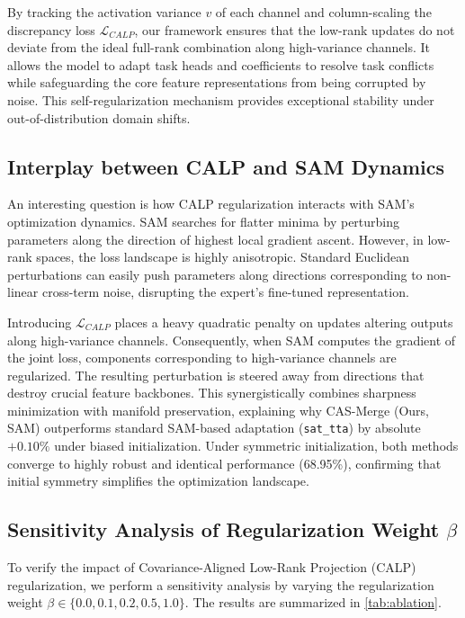 \documentclass{article}
\begin{document}
By tracking the activation variance $v$ of each channel and column-scaling the discrepancy loss $\mathcal{L}_{CALP}$, our framework ensures that the low-rank updates do not deviate from the ideal full-rank combination along high-variance channels. It allows the model to adapt task heads and coefficients to resolve task conflicts while safeguarding the core feature representations from being corrupted by noise. This self-regularization mechanism provides exceptional stability under out-of-distribution domain shifts.

\subsection{Interplay between CALP and SAM Dynamics}
An interesting question is how CALP regularization interacts with SAM's optimization dynamics. SAM searches for flatter minima by perturbing parameters along the direction of highest local gradient ascent. However, in low-rank spaces, the loss landscape is highly anisotropic. Standard Euclidean perturbations can easily push parameters along directions corresponding to non-linear cross-term noise, disrupting the expert's fine-tuned representation.

Introducing $\mathcal{L}_{CALP}$ places a heavy quadratic penalty on updates altering outputs along high-variance channels. Consequently, when SAM computes the gradient of the joint loss, components corresponding to high-variance channels are regularized. The resulting perturbation is steered away from directions that destroy crucial feature backbones. This synergistically combines sharpness minimization with manifold preservation, explaining why CAS-Merge (Ours, SAM) outperforms standard SAM-based adaptation (\texttt{sat\_tta}) by absolute $+0.10\%$ under biased initialization. Under symmetric initialization, both methods converge to highly robust and identical performance (68.95\%), confirming that initial symmetry simplifies the optimization landscape.

\subsection{Sensitivity Analysis of Regularization Weight $\beta$}
To verify the impact of Covariance-Aligned Low-Rank Projection (CALP) regularization, we perform a sensitivity analysis by varying the regularization weight $\beta \in \{0.0, 0.1, 0.2, 0.5, 1.0\}$. The results are summarized in \cref{tab:ablation}.
\end{document}
